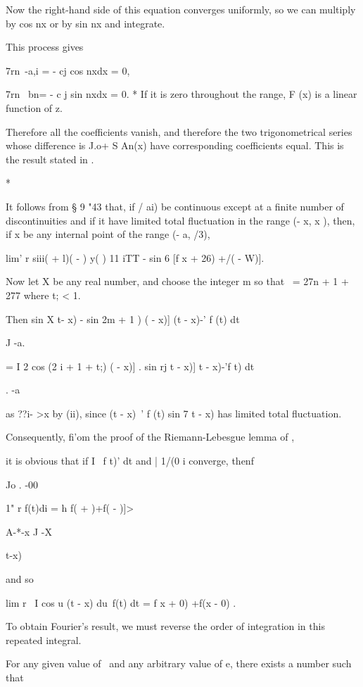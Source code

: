 Now the right-hand side of this equation converges uniformly, so we
can multiply by cos nx or by sin nx and integrate.

This process gives

7rn~-a,i = - cj cos nxdx = 0,

7rn~ bn= - c j sin nxdx = 0. * If it is zero throughout the range, F
(x) is a linear function of z.

%
%
Therefore all the coefficients vanish, and therefore the two
trigonometrical series whose difference is J.o+ S An(x) have
corresponding coefficients equal. This is the result stated in .

*

It follows from § 9 "43 that, if / ai) be continuous except at a
finite number of discontinuities and if it have limited total
fluctuation in the range (- x, x ), then, if x be any internal point
of the range (- a, /3),

lim' r siii( + l)( - ) y( ) 11 iTT - sin 6 [f x + 26) +/( - W)].

Now let X be any real number, and choose the integer m so that \ = 27n
+ 1 + 277 where t; < 1.

Then sin X t- x) - sin 2m + 1 ) ( - x)] (t - x)-' f (t) dt

J -a.

= I 2 cos (2 i + 1 + t;) ( - x)] . sin rj t - x)] t - x)-'f t) dt

. -a

as ??i- >x by  (ii), since (t - x)~' f (t) sin 7 t - x) has
limited total fluctuation.

Consequently, fi'om the proof of the Riemann-Lebesgue lemma of ,

it is obvious that if I \ f t)' dt and | 1/(0 i converge, thenf

Jo . -00

1" r f(t)di = h f( + )+f( - )]>

A-*-x J -X

 t-x)

and so

lim r \ I cos u (t - x) du\ f(t) dt = \pi f x + 0) +f(x - 0) .

To obtain Fourier's result, we must reverse the order of integration
in this repeated integral.

For any given value of \ and any arbitrary value of e, there exists a
number such that

